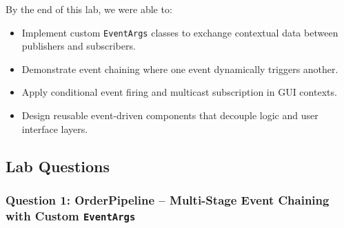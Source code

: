 By the end of this lab, we were able to:
\begin{itemize}
    \item Implement custom \texttt{EventArgs} classes to exchange contextual data between publishers and subscribers.
    \item Demonstrate event chaining where one event dynamically triggers another.
    \item Apply conditional event firing and multicast subscription in GUI contexts.
    \item Design reusable event-driven components that decouple logic and user interface layers.
\end{itemize}

\subsection{Lab Questions}

\subsubsection{Question 1: OrderPipeline -- Multi-Stage Event Chaining with Custom \texttt{EventArgs}}


